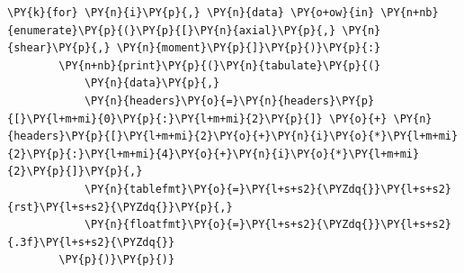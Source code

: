 \begin{tcolorbox}[breakable, size=fbox, boxrule=1pt, pad at break*=1mm,colback=cellbackground, colframe=cellborder]
\begin{Verbatim}[commandchars=\\\{\}]
    \PY{k}{for} \PY{n}{i}\PY{p}{,} \PY{n}{data} \PY{o+ow}{in} \PY{n+nb}{enumerate}\PY{p}{(}\PY{p}{[}\PY{n}{axial}\PY{p}{,} \PY{n}{shear}\PY{p}{,} \PY{n}{moment}\PY{p}{]}\PY{p}{)}\PY{p}{:}
        \PY{n+nb}{print}\PY{p}{(}\PY{n}{tabulate}\PY{p}{(}
            \PY{n}{data}\PY{p}{,}
            \PY{n}{headers}\PY{o}{=}\PY{n}{headers}\PY{p}{[}\PY{l+m+mi}{0}\PY{p}{:}\PY{l+m+mi}{2}\PY{p}{]} \PY{o}{+} \PY{n}{headers}\PY{p}{[}\PY{l+m+mi}{2}\PY{o}{+}\PY{n}{i}\PY{o}{*}\PY{l+m+mi}{2}\PY{p}{:}\PY{l+m+mi}{4}\PY{o}{+}\PY{n}{i}\PY{o}{*}\PY{l+m+mi}{2}\PY{p}{]}\PY{p}{,}
            \PY{n}{tablefmt}\PY{o}{=}\PY{l+s+s2}{\PYZdq{}}\PY{l+s+s2}{rst}\PY{l+s+s2}{\PYZdq{}}\PY{p}{,}
            \PY{n}{floatfmt}\PY{o}{=}\PY{l+s+s2}{\PYZdq{}}\PY{l+s+s2}{.3f}\PY{l+s+s2}{\PYZdq{}}
        \PY{p}{)}\PY{p}{)}
    \end{Verbatim}
    \end{tcolorbox}
    
